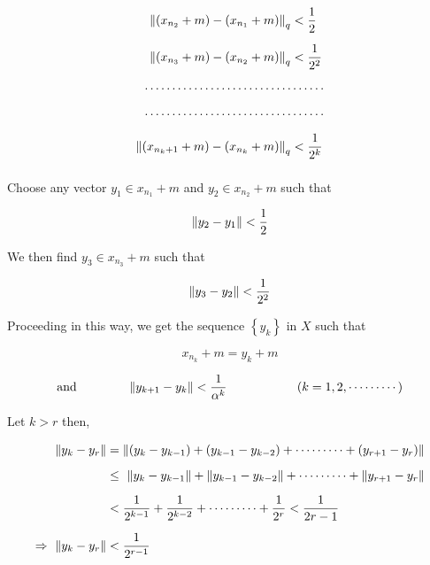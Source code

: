 \documentclass[a4paper,12pt]{article}
\begin{document}
    \begin{equation*}
        \begin{split}
            \norm{(x_{n_2} + m) - (x_{n_1} + m)}_q & < \frac{1}{2}\\[2mm]
            \norm{(x_{n_3} + m) - (x_{n_2} + m)}_q & < \frac{1}{2^2}\\[2mm]
            \cdots \cdots \cdots  \cdots \cdots \cdots \cdots \cdots \cdots & \cdots \cdots \\[2mm]
            \cdots \cdots \cdots  \cdots \cdots \cdots \cdots \cdots \cdots & \cdots \cdots \\[2mm]
            \norm{(x_{n_k+1} + m) - (x_{n_k} + m)}_q & < \frac{1}{2^k}\\[2mm]
        \end{split}
    \end{equation*}

    Choose any vector $y_1\in x_{n_1} + m$  and $y_2\in x_{n_2} + m$ such that
    
    \[\norm{y_2 - y_1} < \frac{1}{2}\]

    We then find $y_3\in x_{n_3} + m$ such that

    \[\norm{y_3 - y_2} < \frac{1}{2^2}\]

    \vspace*{0.5cm}

    Proceeding in this way, we get the sequence $\left\{y_k\right\}$ in $X$ such that 

    \[x_{n_k} + m = y_k  + m\]

    \[\mbox{and}\hspace*{1.5cm} \norm{y_{k+1} - y_k} < \frac{1}{\alpha^k} \hspace*{2cm} (k = 1,2,\cdots \cdots \cdots)\]

    Let $k > r$ then,

    \begin{equation*}
        \begin{split}
            \norm{y_k - y_r} &  = \norm{(y_k - y_{k-1}) + (y_{k-1} - y_{k-2}) + \cdots \cdots \cdots + (y_{r +1} - y_r)}\\[2mm]
            & \leq\ \norm{y_k - y_{k-1}} + \norm{y_{k-1} - y_{k-2}} + \cdots \cdots \cdots + \norm{y_{r + 1} - y_{r}}\\[2mm]
            & < \frac{1}{2^{k-1}} + \frac{1}{2^{k-2}} + \cdots \cdots \cdots + \frac{1}{2^r} < \frac{1}{2{r-1}}\\[2mm]
            \Rightarrow\ \norm{y_k - y_r} & < \frac{1}{2^{r-1}}
        \end{split}
    \end{equation*}
\end{document}
